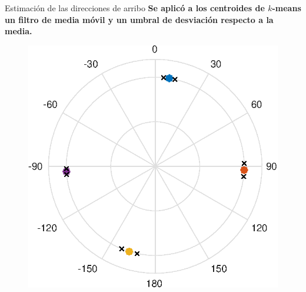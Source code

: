 \documentclass[12pt,aspectratio=169]{beamer}
\begin{document}
	\begin{frame}{Estimación de las direcciones de arribo}
		\textbf{Se aplicó a los centroides de $k$-means un filtro de media móvil y un umbral de desviación respecto a la media.}
		
		\begin{figure}[h]
			\centering
			\includegraphics[width=0.4\linewidth]{figures/polar4color}
		\end{figure}
	\end{frame}
	
%		
%	
%		
	
\end{document}
